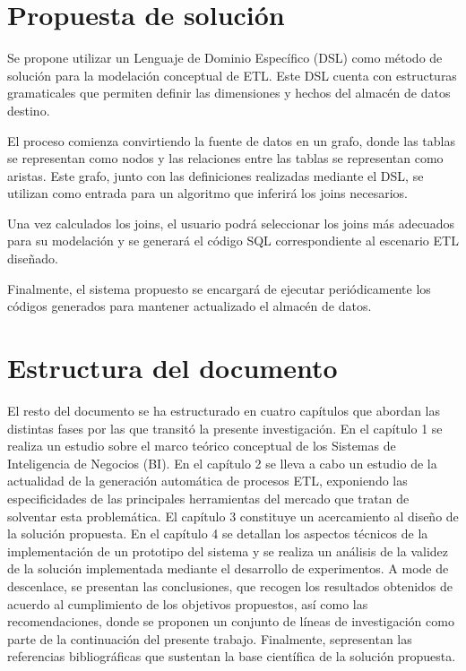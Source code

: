 \section{Propuesta de soluci\'on}

Se propone utilizar un Lenguaje de Dominio Específico (DSL) como método de solución para la modelación conceptual de ETL. 
Este DSL cuenta con estructuras gramaticales que permiten definir las dimensiones y hechos del almacén de datos destino.

El proceso comienza convirtiendo la fuente de datos en un grafo, donde las tablas se representan como nodos y las relaciones 
entre las tablas se representan como aristas. Este grafo, junto con las definiciones realizadas mediante el DSL, se utilizan 
como entrada para un algoritmo que inferirá los joins necesarios.

Una vez calculados los joins, el usuario podrá seleccionar los joins más adecuados para su modelación y se generará el 
código SQL correspondiente al escenario ETL diseñado.

Finalmente, el sistema propuesto se encargará de ejecutar periódicamente los códigos generados para mantener actualizado 
el almacén de datos. 

\section{Estructura del documento}

El resto del documento se ha estructurado en cuatro capítulos que abordan las distintas fases por las que transitó la 
presente investigación. En el cap\'itulo 1 se realiza un estudio sobre el marco te\'orico conceptual de los Sistemas de 
Inteligencia de Negocios (BI). En el cap\'itulo 2 se lleva a cabo un estudio de la actualidad de la generaci\'on autom\'atica 
de procesos ETL, exponiendo las especificidades de las principales herramientas del mercado que tratan de solventar esta 
problem\'atica. El cap\'itulo 3 constituye un acercamiento al diseño de la soluci\'on propuesta. En el capítulo 4 se 
detallan los aspectos técnicos de la implementación de un prototipo del sistema y se realiza un análisis de la validez de 
la solución implementada mediante el desarrollo de experimentos. A mode de descenlace, se presentan las conclusiones,
que recogen los resultados obtenidos de acuerdo al cumplimiento de los objetivos propuestos, así como las recomendaciones, 
donde se proponen un conjunto de líneas de investigación como parte de la continuación del presente trabajo. Finalmente, 
sepresentan las referencias bibliográficas que sustentan la base científica de la solución propuesta.